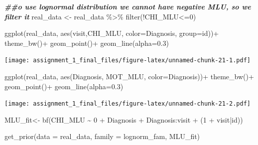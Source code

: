 \documentclass[
]{article}
\newenvironment{Shaded}{\begin{snugshade}}{\end{snugshade}}
\newcommand{\AttributeTok}[1]{\textcolor[rgb]{0.77,0.63,0.00}{#1}}
\newcommand{\DecValTok}[1]{\textcolor[rgb]{0.00,0.00,0.81}{#1}}
\newcommand{\DocumentationTok}[1]{\textcolor[rgb]{0.56,0.35,0.01}{\textbf{\textit{#1}}}}
\newcommand{\FloatTok}[1]{\textcolor[rgb]{0.00,0.00,0.81}{#1}}
\newcommand{\FunctionTok}[1]{\textcolor[rgb]{0.00,0.00,0.00}{#1}}
\newcommand{\NormalTok}[1]{#1}
\newcommand{\OtherTok}[1]{\textcolor[rgb]{0.56,0.35,0.01}{#1}}
\newcommand{\SpecialCharTok}[1]{\textcolor[rgb]{0.00,0.00,0.00}{#1}}
\begin{document}
\begin{Shaded}
\begin{Highlighting}[]
\DocumentationTok{\#\#o use lognormal distribution we cannot have negative MLU, so we filter it}
\NormalTok{real\_data }\OtherTok{\textless{}{-}}\NormalTok{ real\_data }\SpecialCharTok{\%\textgreater{}\%} 
  \FunctionTok{filter}\NormalTok{(}\SpecialCharTok{!}\NormalTok{CHI\_MLU}\SpecialCharTok{\textless{}=}\DecValTok{0}\NormalTok{)}
\end{Highlighting}
\end{Shaded}

\begin{Shaded}
\begin{Highlighting}[]
\FunctionTok{ggplot}\NormalTok{(real\_data, }\FunctionTok{aes}\NormalTok{(visit,CHI\_MLU, }\AttributeTok{color=}\NormalTok{Diagnosis, }\AttributeTok{group=}\NormalTok{id))}\SpecialCharTok{+}
  \FunctionTok{theme\_bw}\NormalTok{()}\SpecialCharTok{+}
  \FunctionTok{geom\_point}\NormalTok{()}\SpecialCharTok{+}
  \FunctionTok{geom\_line}\NormalTok{(}\AttributeTok{alpha=}\FloatTok{0.3}\NormalTok{)}
\end{Highlighting}
\end{Shaded}

\texttt{[image: assignment\_1\_final\_files/figure-latex/unnamed-chunk-21-1.pdf]}

\begin{Shaded}
\begin{Highlighting}[]
\FunctionTok{ggplot}\NormalTok{(real\_data, }\FunctionTok{aes}\NormalTok{(Diagnosis, MOT\_MLU, }\AttributeTok{color=}\NormalTok{Diagnosis))}\SpecialCharTok{+}
  \FunctionTok{theme\_bw}\NormalTok{()}\SpecialCharTok{+}
  \FunctionTok{geom\_point}\NormalTok{()}\SpecialCharTok{+}
  \FunctionTok{geom\_line}\NormalTok{(}\AttributeTok{alpha=}\FloatTok{0.3}\NormalTok{)}
\end{Highlighting}
\end{Shaded}

\texttt{[image: assignment\_1\_final\_files/figure-latex/unnamed-chunk-21-2.pdf]}

\begin{Shaded}
\begin{Highlighting}[]
\NormalTok{MLU\_fit}\OtherTok{\textless{}{-}} \FunctionTok{bf}\NormalTok{(CHI\_MLU }\SpecialCharTok{\textasciitilde{}} \DecValTok{0} \SpecialCharTok{+}\NormalTok{ Diagnosis }\SpecialCharTok{+}\NormalTok{ Diagnosis}\SpecialCharTok{:}\NormalTok{visit }\SpecialCharTok{+}\NormalTok{ (}\DecValTok{1} \SpecialCharTok{+}\NormalTok{ visit}\SpecialCharTok{|}\NormalTok{id))}

\FunctionTok{get\_prior}\NormalTok{(}\AttributeTok{data =}\NormalTok{ real\_data, }\AttributeTok{family =}\NormalTok{ lognorm\_fam, MLU\_fit)}
\end{Highlighting}
\end{Shaded}
\end{document}
